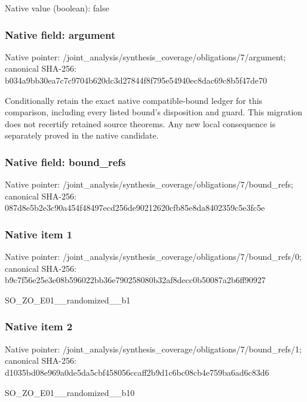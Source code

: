 \documentclass[10pt,a4paper]{article}
\begin{document}
Native value (boolean): false

\subsubsection{Native field: argument}
Native pointer: /joint\_\allowbreak{}analysis/synthesis\_\allowbreak{}coverage/obligations/7/argument; canonical SHA-256: b034a9bb30ea7c7c9704b620dc3d27844f8f795e54940ec8dac69c8b5f47de70

\begingroup\raggedright\sloppy Conditionally retain the exact native compatible-bound ledger for this comparison,\allowbreak{} including every listed bound's disposition and guard. This migration does not recertify retained source theorems. Any new local consequence is separately proved in the native candidate.\par\endgroup

\subsubsection{Native field: bound\_\allowbreak{}refs}
Native pointer: /joint\_\allowbreak{}analysis/synthesis\_\allowbreak{}coverage/obligations/7/bound\_\allowbreak{}refs; canonical SHA-256: 087d8e5b2e3c90a454f48497ecd256de90212620cfb85e8da8402359c5e3fc5e

\subsubsection{Native item 1}
Native pointer: /joint\_\allowbreak{}analysis/synthesis\_\allowbreak{}coverage/obligations/7/bound\_\allowbreak{}refs/0; canonical SHA-256: b9c7f56e25e3e08b596022bb36e790258080b32af8decc0b50087a2b6ff90927

\begingroup\raggedright\sloppy SO\_\allowbreak{}ZO\_\allowbreak{}E01\_\allowbreak{}\_\allowbreak{}randomized\_\allowbreak{}\_\allowbreak{}b1\par\endgroup

\subsubsection{Native item 2}
Native pointer: /joint\_\allowbreak{}analysis/synthesis\_\allowbreak{}coverage/obligations/7/bound\_\allowbreak{}refs/1; canonical SHA-256: d1035bd08e969a0de5da5cbf458056ccaff2b9d1c6bc08cb4e759ba6ad6c83d6

\begingroup\raggedright\sloppy SO\_\allowbreak{}ZO\_\allowbreak{}E01\_\allowbreak{}\_\allowbreak{}randomized\_\allowbreak{}\_\allowbreak{}b10\par\endgroup
\end{document}
